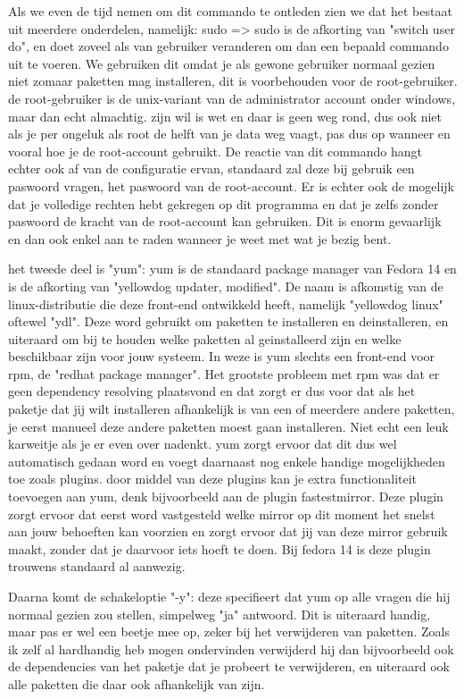 Als we even de tijd nemen om dit commando te ontleden zien we dat het bestaat uit meerdere onderdelen, namelijk: sudo => sudo is de afkorting van "switch user do", en doet zoveel als van gebruiker veranderen om dan een bepaald commando uit te voeren. We gebruiken dit omdat je als gewone gebruiker normaal gezien niet zomaar paketten mag installeren, dit is voorbehouden voor de root-gebruiker. de root-gebruiker is de unix-variant van de administrator account onder windows, maar dan echt almachtig. zijn wil is wet en daar is geen weg rond, dus ook niet als je per ongeluk als root de helft van je data weg vaagt, pas dus op wanneer en vooral hoe je de root-account gebruikt. De reactie van dit commando hangt echter ook af van de configuratie ervan, standaard zal deze bij gebruik een paswoord vragen, het paswoord van de root-account. Er is echter ook de mogelijk dat je volledige rechten hebt gekregen op dit programma en dat je zelfs zonder paswoord de kracht van de root-account kan gebruiken. Dit is enorm gevaarlijk en dan ook enkel aan te raden wanneer je weet met wat je bezig bent.

het tweede deel is "yum": yum is de standaard package manager van Fedora 14 en is de afkorting van "yellowdog updater, modified". De naam is afkomstig van de linux-distributie die deze front-end ontwikkeld heeft, namelijk "yellowdog linux" oftewel "ydl". Deze word gebruikt om paketten te installeren en deinstalleren, en uiteraard om bij te houden welke paketten al geinstalleerd zijn en welke beschikbaar zijn voor jouw systeem. In weze is yum slechts een front-end voor rpm, de "redhat package manager". Het grootste probleem met rpm was dat er geen dependency resolving plaatsvond en dat zorgt er dus voor dat als het paketje dat jij wilt installeren afhankelijk is van een of meerdere andere paketten, je eerst manueel deze andere paketten moest gaan installeren. Niet  echt een leuk karweitje als je er even over nadenkt. yum zorgt ervoor dat dit dus wel automatisch gedaan word en voegt daarnaast nog enkele handige mogelijkheden toe zoals plugins. door middel van deze plugins kan je extra functionaliteit toevoegen aan yum, denk bijvoorbeeld aan de plugin fastestmirror. Deze plugin zorgt ervoor dat eerst word vastgesteld welke mirror op dit moment het snelst aan jouw behoeften kan voorzien en zorgt ervoor dat jij van deze mirror gebruik maakt, zonder dat je daarvoor iets hoeft te doen. Bij fedora 14 is deze plugin trouwens standaard al aanwezig.

Daarna komt de schakeloptie "-y": deze specifieert dat yum op alle vragen die hij normaal gezien zou stellen, simpelweg "ja" antwoord. Dit is uiteraard handig, maar pas er wel een beetje mee op, zeker bij het verwijderen van paketten. Zoals ik zelf al hardhandig heb mogen ondervinden verwijderd hij dan bijvoorbeeld ook de dependencies van het paketje dat je probeert te verwijderen, en uiteraard ook alle paketten die daar ook afhankelijk van zijn. 

